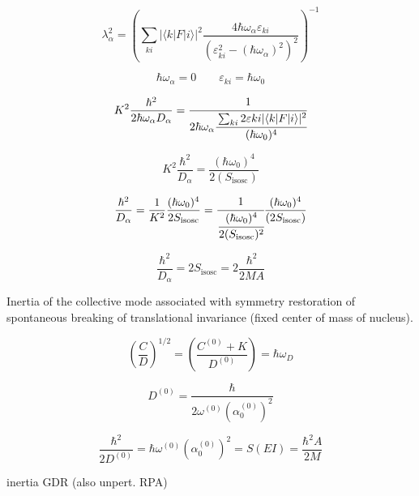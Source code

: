 \documentclass[a4paper,onecolumn,superscriptaddress,12pt,nofootinbib,twoside,raggedfooter,notitlepage]{revtex4-1}
\begin{document}
$$ \lambda_\alpha^2 = \left( \sum_{ki} | \langle k | F| i \rangle |^2 \frac{4 \hbar \omega_\alpha \varepsilon_{ki}}{\left( \varepsilon_{ki}^2 - (\hbar \omega_\alpha)^2 \right)^2} \right)^{-1} $$

$$ \hbar \omega_\alpha = 0 \qquad \varepsilon_{ki} = \hbar \omega_0 $$

$$ K^2 \frac{\hbar^2}{2\hbar \omega_\alpha D_\alpha} = \cfrac{1}{2\hbar\omega_\alpha \cfrac{\sum_{ki} 2 \varepsilon{ki} | \langle k | F| i \rangle |^2}{(\hbar \omega_0)^4}}$$

$$ K^2 \frac{\hbar^2}{D_\alpha} = \frac{(\hbar \omega_0)^4}{2(S_\textrm{isosc})} $$

$$ \frac{\hbar^2}{D_\alpha} = \frac{1}{K^2} \frac{(\hbar \omega_0)^4}{2 S_\textrm{isosc}} = \cfrac{1}{\cfrac{(\hbar \omega_0)^4}{2(S_\textrm{isosc})^2}} \frac{(\hbar \omega_0)^4}{(2 S_\textrm{isosc})} $$

$$ \frac{\hbar^2}{D_\alpha} = 2 S_\textrm{isosc} = 2 \frac{\hbar^2}{2MA} $$

\begin{center}
\end{center}

Inertia of the collective mode associated with symmetry restoration of spontaneous breaking of translational invariance (fixed center of mass of nucleus).

\vspace{3cm}

$$ \left( \frac{C}{D} \right)^{1/2} = \left( \frac{C^{(0)} + K}{D^{(0)}} \right) = \hbar \omega_D$$

$$ D^{(0)} = \frac{\hbar}{2 \omega^{(0)} \left( \alpha_0^{(0)}\right)^2} $$

$$ \frac{\hbar^2}{2D^{(0)}} = \hbar \omega^{(0)} \left( \alpha_0^{(0)} \right)^2 = S(EI) = \frac{\hbar^2 A}{2M} $$

\begin{center}
	 \qquad inertia GDR (also unpert. RPA)
\end{center}
\end{document}
